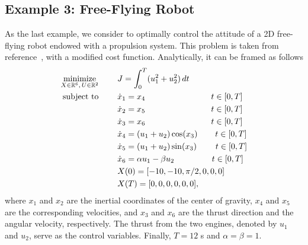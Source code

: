 \subsection*{Example 3: Free-Flying Robot}
As the last example, we consider to optimally control the attitude of a 2D free-flying robot endowed with a propulsion system. This problem is taken from reference~\cite{Betts:book:2010}, with a modified cost function. Analytically, it can be framed as follows
\begin{subequations}\label{eq:free}
	\begin{align}
	\underset{X \in \mathbb{R}^{6}, \, U \in \mathbb{R}^{2}}{\text{minimize}}\hspace{8mm}
	&J = \int_{0}^{T}(u_{1}^{2} +  u_{2}^{2})\,dt  \label{eq:freecost}\\
	\text{subject to} \hspace{8mm}
	& \dot{x}_1 = x_4 \hspace{28mm} t \in[0,T] \label{eq:freedyn1}\\
	& \dot{x}_2 = x_5 \hspace{28mm} t \in[0,T] \label{eq:freedyn2}\\
	& \dot{x}_3 = x_6\hspace{28mm} t \in[0,T] \label{eq:freedyn3}\\
	& \dot{x}_4 = (u_1 + u_2)\cos(x_3)\hspace{7.5mm} t \in[0,T] \label{eq:freedyn4}\\
	& \dot{x}_5 = (u_1 + u_2)\sin(x_3)\hspace{8mm} t \in[0,T] \label{eq:freedyn5}\\
	& \dot{x}_6 = \alpha u_1 - \beta u_2\hspace{16mm} t \in[0,T] \label{eq:freedyn6}\\
	&X(0) = [-10, -10, \pi/2, 0, 0, 0]\\
	&X(T) = [0, 0, 0, 0, 0, 0], \label{eq:freefinal1}		
	\end{align}
\end{subequations}
where $x_1$ and $x_2$ are the inertial coordinates of the center of gravity, $x_4$ and $x_5$ are the corresponding velocities, and $x_3$ and $x_6$ are the thrust direction and the angular velocity, respectively. The thrust from the two engines, denoted by $u_1$ and $u_2$, serve as the control variables. Finally, $T = 12$ s and $\alpha = \beta = 1$.
